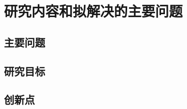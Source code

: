 \chapter{研究内容和拟解决的主要问题}
\section{主要问题}
\placeholder
\section{研究目标}
\placeholder
\section{创新点}
\placeholder
